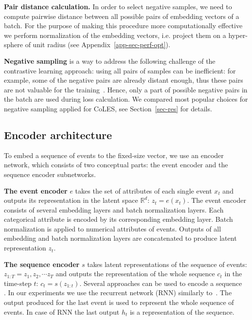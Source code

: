 \documentclass{article}
\newcommand{\R}{\mathbb{R}}
\begin{document}
\textbf{Pair distance calculation.} In order to select negative samples, we need to compute pairwise distance between all possible pairs of embedding vectors of a batch. For the purpose of making this procedure more computationally effective we perform normalization of the embedding vectors, i.e. project them on a hyper-sphere of unit radius (see Appendix~\ref{app-sec-perf-opt}).


\textbf{Negative sampling} is a way to address the following challenge of the contrastive learning approach: using all pairs of samples can be inefficient: for example, some of the negative pairs are already distant enough, thus these pairs are not valuable for the training~\citep{SimoSerra2015DiscriminativeLO, Schroff2015FaceNetAU}. Hence, only a part of possible negative pairs in the batch are used during loss calculation. We compared most popular choices for negative sampling applied for CoLES, see Section~\ref{sec-res} for details.

\subsection{Encoder architecture} \label{sec-enc-arch}

To embed a sequence of events to the fixed-size vector, we use an encoder network, which consists of two conceptual parts: the event encoder and the sequence encoder subnetworks.

\textbf{The event encoder} $e$ takes the set of attributes of each single event $x_t$ and outputs its representation in the latent space $\R^d$: $z_t = e(x_t)$. The event encoder consists of several embedding layers and batch normalization layers. Each categorical attribute is encoded by its corresponding embedding layer. Batch normalization is applied to numerical attributes of events. Outputs of all embedding and batch normalization layers are concatenated to produce latent representation $z_t$.

\textbf{The sequence encoder} $s$ takes latent representations of the sequence of events: $ z_{1:T} = z_1, z_2, \cdots z_T $ and outputs the representation of the whole sequence $c_t$ in the time-step $t$: $ c_t = s(z_{1:t}) $.
Several approaches can be used to encode a sequence~\citep{Cho2014LearningPR, Vaswani2017AttentionIA} . In our experiments we use the recurrent network (RNN) similarly to~\citep{Sutskever2014SequenceTS}. The output produced for the last event is used to represent the whole sequence of events. In case of RNN the last output $h_t$ is a representation of the sequence.
\end{document}
